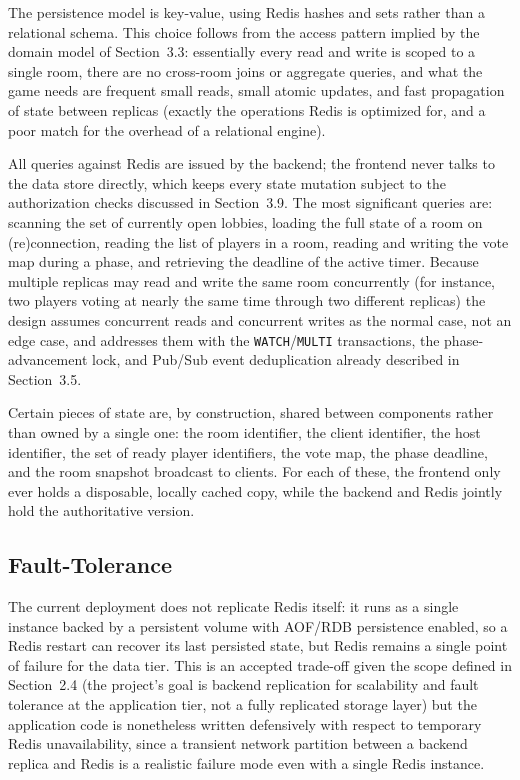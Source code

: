 \documentclass{scrartcl}
\begin{document}
The persistence model is key-value, using Redis hashes and sets rather than a relational schema. This choice follows from the access pattern implied by the domain model of Section~3.3: essentially every read and write is scoped to a single room, there are no cross-room joins or aggregate queries, and what the game needs are frequent small reads, small atomic updates, and fast propagation of state between replicas (exactly the operations Redis is optimized for, and a poor match for the overhead of a relational engine).

All queries against Redis are issued by the backend; the frontend never talks to the data store directly, which keeps every state mutation subject to the authorization checks discussed in Section~3.9. The most significant queries are: scanning the set of currently open lobbies, loading the full state of a room on (re)connection, reading the list of players in a room, reading and writing the vote map during a phase, and retrieving the deadline of the active timer. Because multiple replicas may read and write the same room concurrently (for instance, two players voting at nearly the same time through two different replicas) the design assumes concurrent reads and concurrent writes as the normal case, not an edge case, and addresses them with the \texttt{WATCH}/\texttt{MULTI} transactions, the phase-advancement lock, and Pub/Sub event deduplication already described in Section~3.5.

Certain pieces of state are, by construction, shared between components rather than owned by a single one: the room identifier, the client identifier, the host identifier, the set of ready player identifiers, the vote map, the phase deadline, and the room snapshot broadcast to clients. For each of these, the frontend only ever holds a disposable, locally cached copy, while the backend and Redis jointly hold the authoritative version.

\subsection{Fault-Tolerance}

The current deployment does not replicate Redis itself: it runs as a single instance backed by a persistent volume with AOF/RDB persistence enabled, so a Redis restart can recover its last persisted state, but Redis remains a single point of failure for the data tier. This is an accepted trade-off given the scope defined in Section~2.4 (the project's goal is backend replication for scalability and fault tolerance at the application tier, not a fully replicated storage layer) but the application code is nonetheless written defensively with respect to temporary Redis unavailability, since a transient network partition between a backend replica and Redis is a realistic failure mode even with a single Redis instance.
\end{document}
